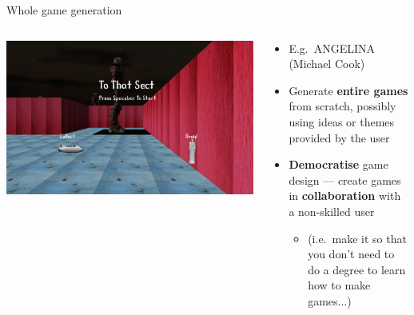 \begin{frame}{Whole game generation}
	\begin{columns}
		\begin{column}{0.4\textwidth}
			\pause\includegraphics[width=\textwidth]{tothatsect}
		\end{column}
		\begin{column}{0.55\textwidth}
			\begin{itemize}
				\pause\item E.g.\ ANGELINA (Michael Cook)
				\pause\item Generate \textbf{entire games} from scratch, possibly using ideas or themes provided by the user
				\pause\item \textbf{Democratise} game design --- create games in \textbf{collaboration} with a
					non-skilled user
					\begin{itemize}
						\pause\item (i.e.\ make it so that you don't need to do a degree to learn how to make games...)
					\end{itemize}
			\end{itemize}
		\end{column}
	\end{columns}
\end{frame}


